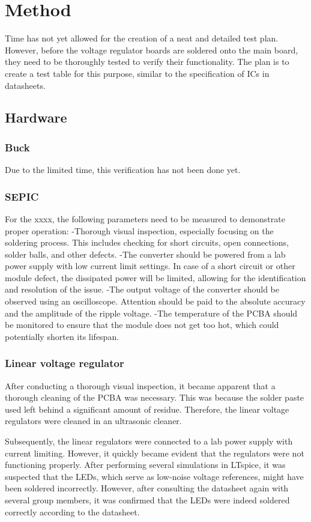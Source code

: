 \section{Method}
Time has not yet allowed for the creation of a neat and detailed test plan. However, before the voltage regulator boards are soldered onto the main board, they need to be thoroughly tested to verify their functionality. The plan is to create a test table for this purpose, similar to the specification of ICs in datasheets.

\subsection{Hardware}
\subsubsection{Buck}
Due to the limited time, this verification has not been done yet.

\subsubsection{SEPIC}
For the xxxx, the following parameters need to be measured to demonstrate proper operation:
-Thorough visual inspection, especially focusing on the soldering process. This includes checking for short circuits, open connections, solder balls, and other defects.
-The converter should be powered from a lab power supply with low current limit settings. In case of a short circuit or other module defect, the dissipated power will be limited, allowing for the identification and resolution of the issue.
-The output voltage of the converter should be observed using an oscilloscope. Attention should be paid to the absolute accuracy and the amplitude of the ripple voltage.
-The temperature of the PCBA should be monitored to ensure that the module does not get too hot, which could potentially shorten its lifespan.

\subsubsection{Linear voltage regulator}
After conducting a thorough visual inspection, it became apparent that a thorough cleaning of the PCBA was necessary. This was because the solder paste used left behind a significant amount of residue. Therefore, the linear voltage regulators were cleaned in an ultrasonic cleaner.

Subsequently, the linear regulators were connected to a lab power supply with current limiting. However, it quickly became evident that the regulators were not functioning properly. After performing several simulations in LTspice, it was suspected that the LEDs, which serve as low-noise voltage references, might have been soldered incorrectly. However, after consulting the datasheet again with several group members, it was confirmed that the LEDs were indeed soldered correctly according to the datasheet.


